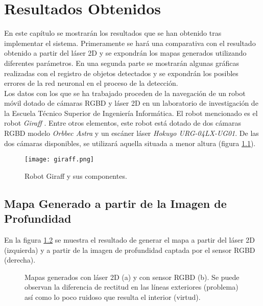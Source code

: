 \chapter{Resultados Obtenidos} \label{chapter.resultados}

En este capítulo se mostrarán los resultados que se han obtenido tras implementar el sistema. Primeramente se hará una comparativa con el resultado obtenido a partir del láser 2D y se expondrán los mapas generados utilizando diferentes parámetros. En una segunda parte se mostrarán algunas gráficas realizadas con el registro de objetos detectados y se expondrán los posibles errores de la red neuronal en el proceso de la detección.\\

Los datos con los que se ha trabajado proceden de la navegación de un robot móvil dotado de cámaras RGBD y láser 2D en un laboratorio de investigación de la Escuela Técnico Superior de Ingeniería Informática. El robot mencionado es el robot \textit{Giraff} \cite{giraff}. Entre otros elementos, este robot está dotado de dos cámaras RGBD modelo \textit{Orbbec Astra} y un escáner láser \textit{Hokuyo URG-04LX-UG01}. De las dos cámaras disponibles, se utilizará aquella situada a menor altura (figura \ref{fig:giraff}). \\

\begin{figure}[h]
	\begin{center} 
		\texttt{[image: giraff.png]}
	\end{center}
	\caption{Robot Giraff y sus componentes. \cite{giraff}}
	\label{fig:giraff}
\end{figure}

\section{Mapa Generado a partir de la Imagen de Profundidad}

En la figura \ref{fig:res_mapas} se muestra el resultado de generar el mapa a partir del láser 2D (izquierda) y a partir de la imagen de profundidad captada por el sensor RGBD (derecha).\\

\begin{figure}[h]
 \centering
 \caption{Mapas generados con láser 2D (a) y con sensor RGBD (b). Se puede observan la diferencia de rectitud en las líneas exteriores (problema) así como lo poco ruidoso que resulta el interior (virtud).}
 \label{fig:res_mapas}
\end{figure}

